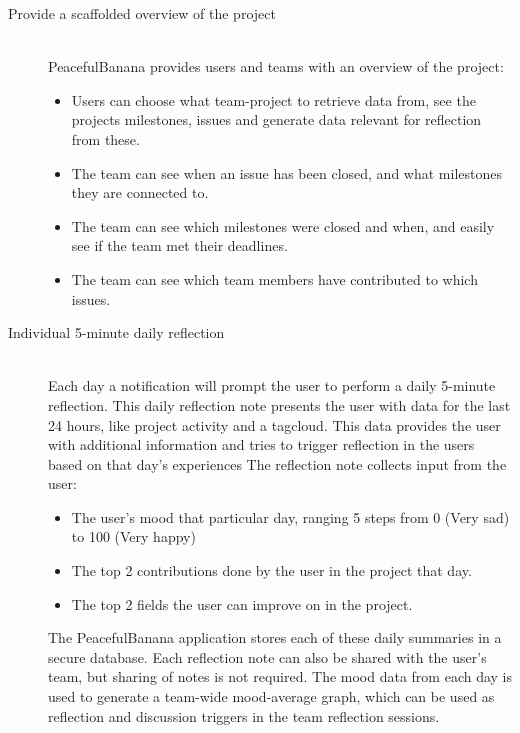 \begin{description}
	\item[Provide a scaffolded overview of the project] \hfill \\
	PeacefulBanana provides users and teams with an overview of the project:
	\begin{itemize}
		\item Users can choose what team-project to retrieve data from, see the projects milestones, issues and generate data relevant for reflection from these.
		\item The team can see when an issue has been closed, and what milestones they are connected to.
		\item The team can see which milestones were closed and when, and easily see if the team met their deadlines. 
		\item The team can see which team members have contributed to which issues.
	\end{itemize}

	\item[Individual 5-minute daily reflection] \hfill \\
	Each day a notification will prompt the user to perform a daily 5-minute reflection. This daily reflection note presents the user with data for the last 24 hours, like project activity and a tagcloud. This data provides the user with additional information and tries to trigger reflection in the users based on that day's experiences The reflection note collects input from the user:
	\begin{itemize}
		\item The user's mood that particular day, ranging 5 steps from 0 (Very sad) to 100 (Very happy)
		\item The top 2 contributions done by the user in the project that day.
		\item The top 2 fields the user can improve on in the project.
	\end{itemize}
	The PeacefulBanana application stores each of these daily summaries in a secure database. Each reflection note can also be shared with the user's team, but sharing of notes is not required. The mood data from each day is used to generate a team-wide mood-average graph, which can be used as reflection and discussion triggers in the team reflection sessions.


\end{description}
